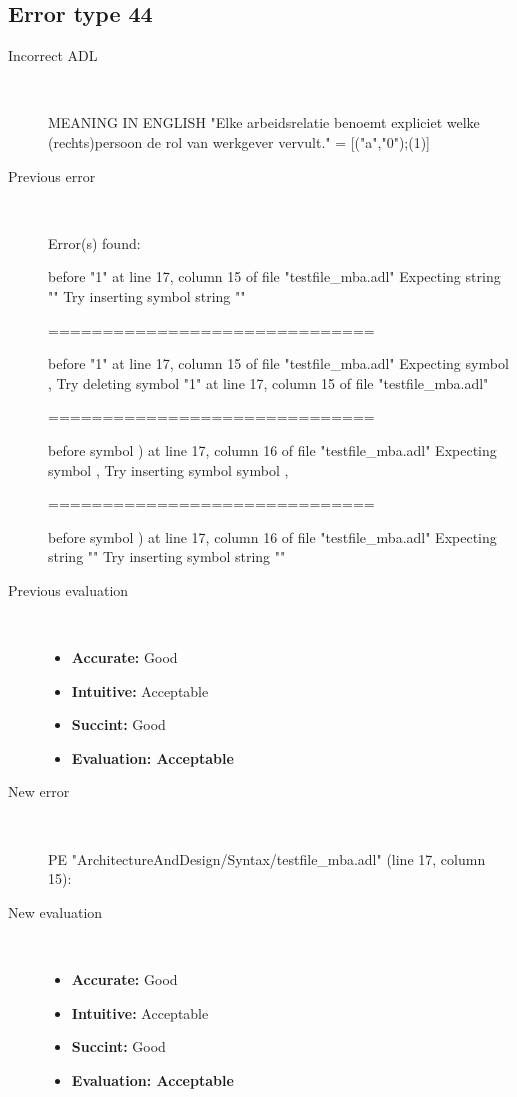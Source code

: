 \subsection{Error type 44}
  \begin{description}
  \item[Incorrect ADL]~\\
\begin{adl}
MEANING IN ENGLISH "Elke arbeidsrelatie benoemt expliciet welke (rechts)persoon de rol van werkgever vervult."
= [("a","0");(1)] \end{adl}
  \item[Previous error]~\\
\begin{haskell}
Error(s) found:

before "1" at line 17, column 15 of file "testfile_mba.adl"
Expecting string ""
Try inserting symbol string ""

==============================

before "1" at line 17, column 15 of file "testfile_mba.adl"
Expecting symbol ,
Try deleting symbol "1" at line 17, column 15 of file "testfile_mba.adl"

==============================

before symbol ) at line 17, column 16 of file "testfile_mba.adl"
Expecting symbol ,
Try inserting symbol symbol ,

==============================

before symbol ) at line 17, column 16 of file "testfile_mba.adl"
Expecting string ""
Try inserting symbol string ""
\end{haskell}
  \item[Previous evaluation]~\\
    \begin{itemize}
    \item \textbf{Accurate:} Good
    \item \textbf{Intuitive:} Acceptable
    \item \textbf{Succint:} Good
    \item \textbf{Evaluation: Acceptable}
    \end{itemize}
  \item[New error]~\\
\begin{haskell}
PE "ArchitectureAndDesign/Syntax/testfile_mba.adl" (line 17, column 15):\end{haskell}
  \item[New evaluation]~\\
    \begin{itemize}
    \item \textbf{Accurate:} Good
    \item \textbf{Intuitive:} Acceptable
    \item \textbf{Succint:} Good
    \item \textbf{Evaluation: Acceptable
}
    \end{itemize}
  \end{description}

